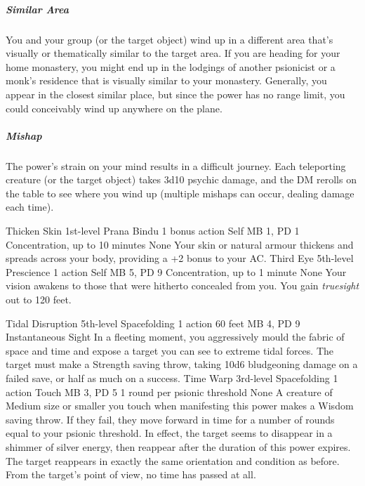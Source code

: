 \subparagraph{Similar Area}
  You and your group (or the target object) wind up in a different area
  that's visually or thematically similar to the target area.
  If you are heading for your home monastery,
  you might end up in the lodgings of another psionicist
  or a monk's residence that is visually similar to your monastery.
  Generally, you appear in the closest similar place,
  but since the power has no range limit,
  you could conceivably wind up anywhere on the plane.

\subparagraph{Mishap}
  The power's strain on your mind results in a difficult journey.
  Each teleporting creature (or the target object) takes 3d10 psychic damage,
  and the DM rerolls on the table to see where you wind up
  (multiple mishaps can occur, dealing damage each time).

\DndPowerHeader%
    {Thicken Skin\label{pwr:thicken-skin}}
    {1st-level Prana Bindu}
    {1 bonus action}
    {Self}
    {MB 1, PD 1}
    {Concentration, up to 10 minutes}
    {None}
Your skin or natural armour thickens and spreads
across your body, providing a +2 bonus to your AC.
\DndPowerHeader%
    {Third Eye\label{pwr:third-eye}}
    {5th-level Prescience}
    {1 action}
    {Self}
    {MB 5, PD 9}
    {Concentration, up to 1 minute}
    {None}
Your vision awakens to those that were hitherto
concealed from you. You gain \emph{truesight} out to 120 feet.

\DndPowerHeader%
    {Tidal Disruption\label{pwr:tidal-disruption}}
    {5th-level Spacefolding}
    {1 action}
    {60 feet}
    {MB 4, PD 9}
    {Instantaneous}
    {Sight}
In a fleeting moment, you aggressively mould the fabric of space and time
and expose a target you can see to extreme tidal forces.
The target must make a Strength saving throw,
taking 10d6 bludgeoning damage on a failed save, or half as much on a success.
\DndPowerHeader%
    {Time Warp\label{pwr:time-warp}}
    {3rd-level Spacefolding}
    {1 action}
    {Touch}
    {MB 3, PD 5}
    {1 round per psionic threshold}
    {None}
A creature of Medium size or smaller you
touch when manifesting this power makes a Wisdom saving throw.
If they fail, they move forward in time for a number of rounds
equal to your psionic threshold. In effect, the target seems
to disappear in a shimmer of silver energy, then reappear
after the duration of this power expires. The target reappears
in exactly the same orientation and condition as before. From
the target's point of view, no time has passed at all.

